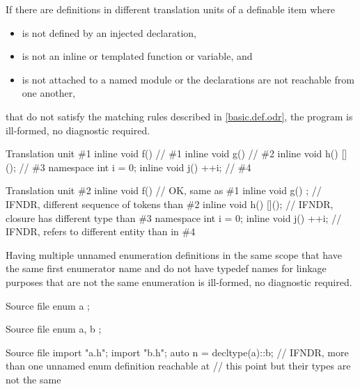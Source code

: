 
\pnum
If there are definitions
in different translation units
of a definable item 
where
\begin{itemize}
\item {} is not defined by an injected declaration,
\item {} is not an inline or templated function or variable, and
\item {} is not attached to a named module or the declarations are not reachable from one another,
\end{itemize}
that do not satisfy the matching rules described in \ref{basic.def.odr},
the program is ill-formed, no diagnostic required.

\pnum
\begin{example}
\begin{codeblocktu}{Translation unit \#1}
inline void f() {}          // \#1
inline void g() {}          // \#2
inline void h() {[]{}();}   // \#3
namespace { int i = 0; }
inline void j() {++i;}      // \#4
\end{codeblocktu}
\begin{codeblocktu}{Translation unit \#2}
inline void f() {}          // OK, same as \#1
inline void g() {;}         // IFNDR, different sequence of tokens than \#2
inline void h() {[]{}();}   // IFNDR, closure has different type than \#3
namespace { int i = 0; }
inline void j() {++i; }     // IFNDR,  refers to different entity than in \#4
\end{codeblocktu}
\end{example}


\pnum
Having multiple unnamed enumeration definitions
in the same scope
that have the same first enumerator name
and do not have typedef names for linkage purposes
that are not the same enumeration
is ill-formed, no diagnostic required.

\pnum
\begin{example}
\begin{codeblocktu}{Source file }
enum { a };
\end{codeblocktu}
\begin{codeblocktu}{Source file }
enum { a, b };
\end{codeblocktu}
\begin{codeblocktu}{Source file }
import "a.h";
import "b.h";
auto n = decltype(a)::b;        // IFNDR, more than one unnamed enum definition reachable at
                                // this point but their types are not the same
\end{codeblocktu}
\end{example}

